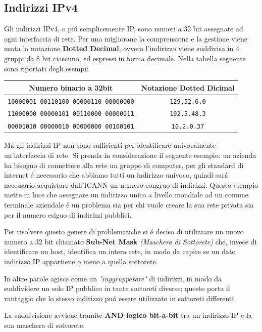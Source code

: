 \documentclass[12pt]{article}
\def\code#1{\texttt{#1}}
\begin{document}
\subsection{Indirizzi IPv4}\label{pazio-indirizzamento-in-ip-indirizzi-ipv4}
Gli indirizzi IPv4, o pi\'u semplicemente IP, sono numeri a 32 bit assegnate ad ogni interfaccia di rete. Per una 
migliorane la comprensione e la gestione viene usata la notazione \textbf{Dotted Decimal}, ovvero l'indirizzo viene 
suddivisa in 4 gruppi da 8 bit ciascuno, ed espressi in forma decimale. Nella tabella seguente sono riportati degli 
esempi:
\begin{center}
	\begin{tabular}{ |c|c| }
		\hline
		\textbf{Numero binario a 32bit} & \textbf{Notazione Dotted Dicimal} \\
 		\hline
 		\code{10000001 00110100 00000110 00000000}  & \code{129.52.6.0}  \\ 
 		\code{11000000 00000101 00110000 00000011}  & \code{192.5.48.3}  \\ 
 		\code{00001010 00000010 00000000 00100101}  & \code{10.2.0.37}  \\  
 		\hline
	\end{tabular}
\end{center}
Ma gli indirizzi IP non sono sufficienti per identificare univocamente un'interfaccia di rete. Si prenda in 
considerazione il seguente esempio: un azienda ha bisogno di connettere alla rete un gruppo di computer, per gli 
standard di internet \'e necessario che abbiamo tutti un indirizzo univoco, quindi sar\'a necessario acquistare 
dall'ICANN un numero congruo di indirizzi. Questo esempio mette in luce che assegnare un indirizzo unico a livello 
mondiale ad un comune terminale aziendale \'e un problema sia per chi vuole creare la sua rete privata sia per il numero 
esiguo di indirizzi pubblici.

Per risolvere questo genere di problematiche si \'e deciso di utilizzare un nuovo numero a 32 bit chiamato 
\textbf{Sub-Net Mask} \textit{(Maschera di Sottorete)} che, invece di identificare un host, identifica un intera rete, 
in modo da capire se un dato indirizzo IP appartiene o meno a quella sottorete.

In altre parole agisce come un \textit{"raggruppatore"} di indirizzi, in modo da suddividere un solo IP pubblico in 
tante sottoreti diverse; questo porta il vantaggio che lo stesso indirizzo pu\'o essere utilizzato in sottoreti 
differenti.

La suddivisione avviene tramite \textbf{AND logico bit-a-bit} tra un indirizzo IP e la sua maschera di sottorete.
\end{document}
